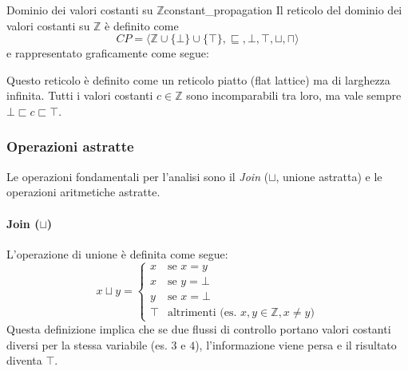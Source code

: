 \begin{esempio}{Dominio dei valori costanti su $\mathbb{Z}$}{constant_propagation}
Il reticolo del dominio dei valori costanti su $\mathbb{Z}$ è definito come
\[
CP = \langle \mathbb{Z} \cup \{\bot\} \cup \{\top\}, \sqsubseteq, \bot, \top, \sqcup, \sqcap \rangle
\]
e rappresentato graficamente come segue:
\begin{figure}[H]
    \centering
\end{figure}
\end{esempio}

Questo reticolo è definito come un reticolo piatto (flat lattice) ma di
larghezza infinita.
Tutti i valori costanti $c \in \mathbb{Z}$ sono incomparabili tra loro, ma
vale sempre $\bot \sqsubset c \sqsubset \top$.

\subsubsection{Operazioni astratte}
Le operazioni fondamentali per l'analisi sono il \textit{Join}
($\sqcup$, unione astratta) e le operazioni aritmetiche astratte.


\paragraph{Join ($\sqcup$)}
L'operazione di unione è definita come segue:
\begin{equation}
    x \sqcup y = \begin{cases} 
    x & \text{se } x = y \\
    x & \text{se } y = \bot \\
    y & \text{se } x = \bot \\
    \top & \text{altrimenti (es. } x,y \in \mathbb{Z}, x \neq y \text{)}
    \end{cases}
\end{equation}
Questa definizione implica che se due flussi di controllo portano valori costanti diversi per la stessa variabile (es. $3$ e $4$), l'informazione viene persa e il risultato diventa $\top$.

